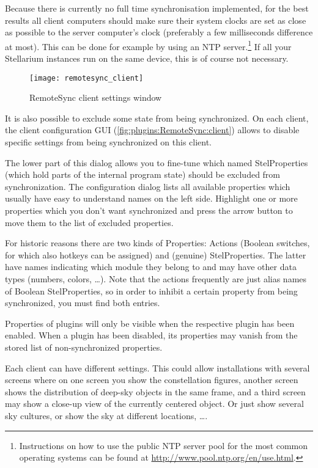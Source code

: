 Because there is currently no full time synchronisation implemented, for the best
results all client computers should make sure their system clocks are set as
close as possible to the server computer's clock (preferably a few milliseconds
difference at most). This can be done for example by using an NTP server.\footnote{
Instructions on how to use the public NTP server pool for the most common
operating systems can be found at \url{http://www.pool.ntp.org/en/use.html}.} 
If all your Stellarium instances run on the same device, this is of course not 
necessary.

\begin{figure}[h]
	\centering\texttt{[image: remotesync\_client]}
	\caption{RemoteSync client settings window}
	\label{fig:plugins:RemoteSync:client}
\end{figure}

It is also possible to exclude some state from being synchronized. On each
client, the client configuration GUI (\autoref{fig:plugins:RemoteSync:client}) allows to
disable specific settings from being synchronized on this client. 

The lower part of this dialog allows you to 
fine-tune which named StelProperties (which hold parts of the internal program state) 
should be excluded from synchronization. 
The configuration dialog lists all available properties which usually have easy to understand 
names on the left side. Highlight one or more properties which you don't want synchronized 
and press the arrow button to move them to the list of excluded properties.

For historic reasons there are two kinds of Properties: Actions 
(Boolean switches, for which also hotkeys can be assigned) and (genuine) StelProperties. 
The latter have names indicating which module they belong to and may have other data types (numbers, colors, \ldots). 
Note that the actions frequently are just alias names of Boolean StelProperties, 
so in order to inhibit a certain property from being synchronized, you must find both entries.

Properties of plugins will only be visible when the respective plugin has been enabled. 
When a plugin has been disabled, its properties may vanish from the stored list of non-synchronized properties.

Each client can have different settings. This could allow installations with several screens
where on one screen you show the constellation figures, another screen shows the
distribution of deep-sky objects in the same frame, and a third screen may show
a close-up view of the currently centered object. Or just show several sky cultures, 
or show the sky at different locations, \ldots. 

